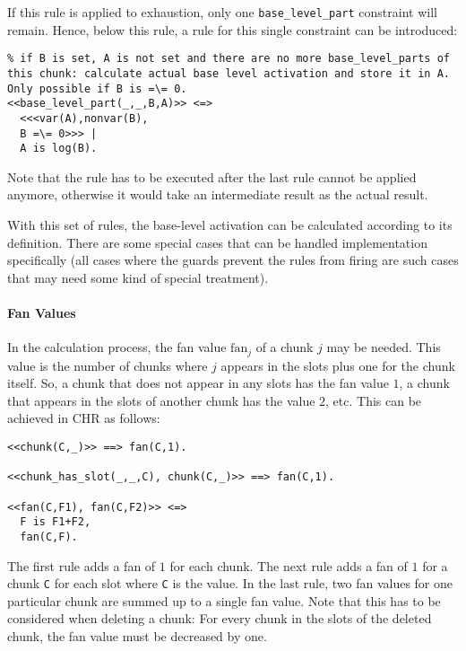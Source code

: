If this rule is applied to exhaustion, only one \lstinline|base_level_part| constraint will remain. Hence, below this rule, a rule for this single constraint can be introduced:

\begin{lstlisting}
% if B is set, A is not set and there are no more base_level_parts of this chunk: calculate actual base level activation and store it in A. Only possible if B is =\= 0.
<<base_level_part(_,_,B,A)>> <=>
  <<<var(A),nonvar(B), 
  B =\= 0>>> |
  A is log(B).
\end{lstlisting}

Note that the rule has to be executed after the last rule cannot be applied anymore, otherwise it would take an intermediate result as the actual result.

With this set of rules, the base-level activation can be calculated according to its definition. There are some special cases that can be handled implementation specifically (all cases where the guards prevent the rules from firing are such cases that may need some kind of special treatment).

\paragraph{Fan Values}

In the calculation process, the fan value $\mathrm{fan}_j$ of a chunk $j$ may be needed. This value is the number of chunks where $j$ appears in the slots plus one for the chunk itself. So, a chunk that does not appear in any slots has the fan value $1$, a chunk that appears in the slots of another chunk has the value $2$, etc. This can be achieved in CHR as follows:

\begin{lstlisting}
<<chunk(C,_)>> ==> fan(C,1).

<<chunk_has_slot(_,_,C), chunk(C,_)>> ==> fan(C,1).

<<fan(C,F1), fan(C,F2)>> <=> 
  F is F1+F2, 
  fan(C,F).
\end{lstlisting}

The first rule adds a fan of $1$ for each chunk. The next rule adds a fan of $1$ for a chunk \lstinline|C| for each slot where \lstinline|C| is the value. In the last rule, two fan values for one particular chunk are summed up to a single fan value. Note that this has to be considered when deleting a chunk: For every chunk in the slots of the deleted chunk, the fan value must be decreased by one.

